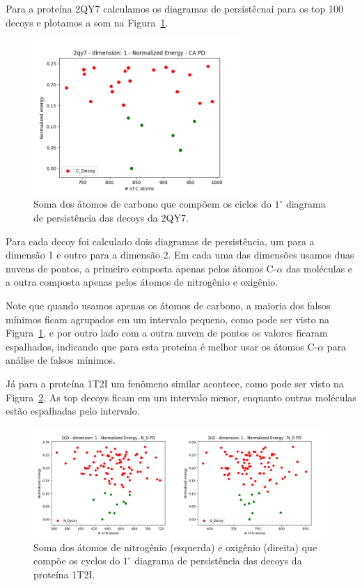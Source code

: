 Para a proteína 2QY7 calculamos os diagramas de persistêcnai para os top 100 decoys e plotamos a
som na Figura~\ref{fig:cyc2qy7}.

\begin{figure}[!htbp]
    \centering
    \includegraphics[width=0.7\textwidth]{images/relatorio/cyc2qy7.png}
    \caption{Soma dos átomos de carbono que compõem os ciclos do
            $1^\circ$ diagrama de persistência das decoys da 2QY7.}
    \label{fig:cyc2qy7}
    \fautor
\end{figure}

Para cada decoy foi calculado dois diagramas de persistência, um para a dimensão 1 e outro para a dimensão 2.
Em cada uma das dimensões usamos duas nuvens de pontos, a primeiro composta apenas pelos átomos C-$\alpha$
das moléculas e a outra composta apenas pelos átomos de nitrogênio e oxigênio.

Note que quando usamos apenas os átomos de carbono, a maioria dos falsos mínimos ficam agrupados em um intervalo
pequeno, como pode ser visto na Figura~\ref{fig:cyc2qy7}, e por outro lado com a outra nuvem de pontos os valores
ficaram espalhados, indicando que para esta proteína é melhor usar os átomos C-$\alpha$ para análise de falsos
mínimos.

Já para a proteína 1T2I um fenômeno similar acontece, como pode ser visto na Figura~\ref{fig:nocyc}. As top decoys
ficam em um intervalo menor, enquanto outras moléculas estão espalhadas pelo intervalo.
\begin{figure}[!htbp]
    \centering
    \includegraphics[width=0.99\textwidth]{images/relatorio/NOcyc.png}
    \caption{Soma dos átomos de nitrogênio (esquerda) e oxigênio (direita) que compõe os cyclos do 
    $1^\circ$ diagrama de persistência das decoys da proteína 1T2I.}    
    \label{fig:nocyc}
    \fautor
\end{figure}

